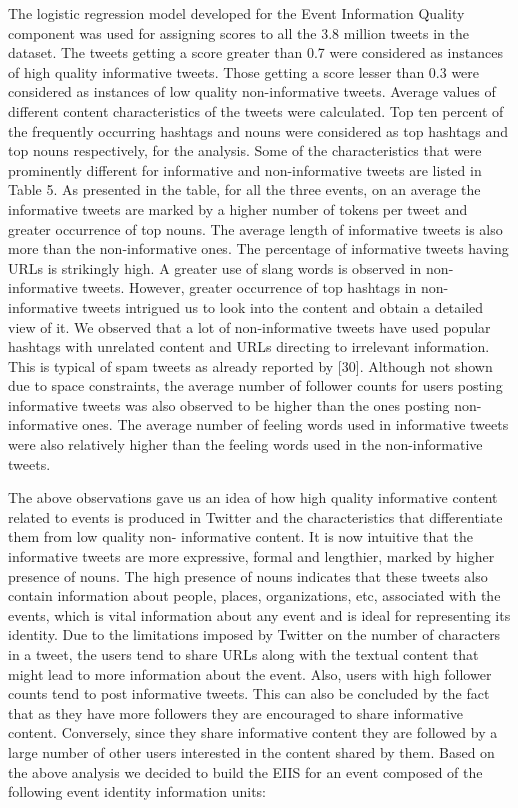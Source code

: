 The logistic regression model developed for the Event Information Quality component was used for assigning scores to all the 3.8 million tweets in the dataset. The tweets getting a score greater than 0.7 were considered as instances of high quality informative tweets. Those getting a score lesser than 0.3 were considered as instances of low quality non-informative tweets. Average values of different content characteristics of the tweets were calculated. Top ten percent of the frequently occurring hashtags and nouns were considered as top hashtags and top nouns respectively, for the analysis. Some of the characteristics that were prominently different for informative and non-informative tweets are listed in Table 5.
As presented in the table, for all the three events, on an average the informative tweets are marked by a higher number of tokens per tweet and greater occurrence of top nouns. The average length of informative tweets is also more than the non-informative ones. The percentage of informative tweets having URLs is strikingly high. A greater use of slang words is observed in non-informative tweets. However, greater occurrence of top hashtags in non-informative tweets intrigued us to look into the content and obtain a detailed view of it. We observed that a lot of non-informative tweets have used popular hashtags with unrelated content and URLs directing to irrelevant information. This is typical of spam tweets as already reported by [30]. Although not shown due to space constraints, the average number of follower counts for users posting informative tweets was also observed to be higher than the ones posting non-informative ones. The average number of feeling words used in informative tweets were also relatively higher than the feeling words used in the non-informative tweets. 

The above observations gave us an idea of how high quality informative content related to events is produced in Twitter and the characteristics that differentiate them from low quality non- informative content. It is now intuitive that the informative tweets are more expressive, formal and lengthier, marked by higher presence of nouns. The high presence of nouns indicates that these tweets also contain information about people, places, organizations, etc, associated with the events, which is vital information about any event and is ideal for representing its identity. Due to the limitations imposed by Twitter on the number of characters in a tweet, the users tend to share URLs along with the textual content that might lead to more information about the event. Also, users with high follower counts tend to post informative tweets. This can also be concluded by the fact that as they have more followers they are encouraged to share informative content. Conversely, since they share informative content they are followed by a large number of other users interested in the content shared by them.
Based on the above analysis we decided to build the EIIS for an event composed of the following event identity information units:



